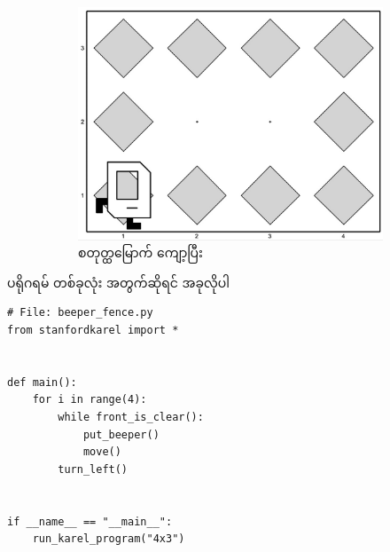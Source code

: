 \begin{figure}[tbh!]
\begin{subfigure}[t]{{\figpctw}\textwidth}
        \includegraphics[scale=\figscale]{images/ch02/beeper_fence/4th_iter.jpg}
        \caption{စတုတ္ထမြောက် ကျော့ပြီး}    
    \end{subfigure}   
    \caption{}
    \label{fig:beeper_fence_iters}
\end{figure}

ပရိုဂရမ် တစ်ခုလုံး အတွက်ဆိုရင် အခုလိုပါ
%
\setlength{\fboxsep}{0pt}
\begin{verbatim}
# File: beeper_fence.py
from stanfordkarel import *


def main():
    for i in range(4):
        while front_is_clear():
            put_beeper()
            move()
        turn_left()


if __name__ == "__main__":
    run_karel_program("4x3")

\end{verbatim}
%

